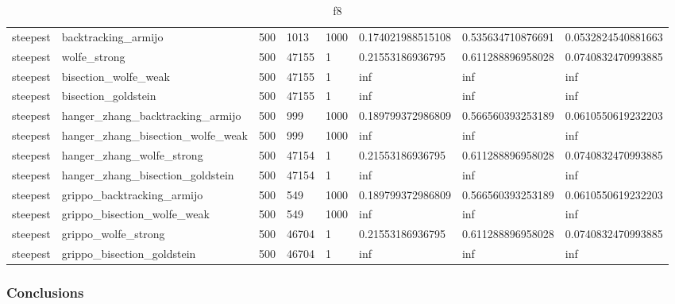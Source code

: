 \documentclass[a4paper,11pt]{article}
\numberwithin{equation}{section} %
\begin{document}
\begin{table}[h!]
{\begin{tabular}{|l|l|l|l|l|l|l|l|}
        steepest & backtracking\_armijo & 500 & 1013 & 1000 & 0.174021988515108 & 0.535634710876691 & 0.0532824540881663 \\
        steepest & wolfe\_strong & 500 & 47155 & 1 & 0.21553186936795 & 0.611288896958028 & 0.0740832470993885 \\
        steepest & bisection\_wolfe\_weak & 500 & 47155 & 1 & inf & inf & inf \\
        steepest & bisection\_goldstein & 500 & 47155 & 1 & inf & inf & inf \\
        steepest & hanger\_zhang\_backtracking\_armijo & 500 & 999 & 1000 & 0.189799372986809 & 0.566560393253189 & 0.0610550619232203 \\
        steepest & hanger\_zhang\_bisection\_wolfe\_weak & 500 & 999 & 1000 & inf & inf & inf \\
        steepest & hanger\_zhang\_wolfe\_strong & 500 & 47154 & 1 & 0.21553186936795 & 0.611288896958028 & 0.0740832470993885 \\
        steepest & hanger\_zhang\_bisection\_goldstein & 500 & 47154 & 1 & inf & inf & inf \\
        steepest & grippo\_backtracking\_armijo & 500 & 549 & 1000 & 0.189799372986809 & 0.566560393253189 & 0.0610550619232203 \\
        steepest & grippo\_bisection\_wolfe\_weak & 500 & 549 & 1000 & inf & inf & inf \\
        steepest & grippo\_wolfe\_strong & 500 & 46704 & 1 & 0.21553186936795 & 0.611288896958028 & 0.0740832470993885 \\
        steepest & grippo\_bisection\_goldstein & 500 & 46704 & 1 & inf & inf & inf \\



\end{tabular}}
\caption{f8}
\label{table:f8}
\end{table}

\clearpage


\subsubsection{Conclusions}
\end{document}
